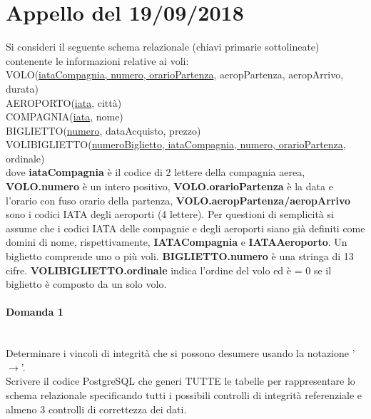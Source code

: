 \documentclass[a4paper, 10pt, titlepage]{article}
\begin{document}
\section{Appello del 19/09/2018}
Si consideri il seguente schema relazionale (chiavi primarie sottolineate) contenente le informazioni relative ai voli: \medskip \\
VOLO(\underline{iataCompagnia, numero, orarioPartenza}, aeropPartenza, aeropArrivo, durata)\\
AEROPORTO(\underline{iata}, città)\\
COMPAGNIA(\underline{iata}, nome)\\
BIGLIETTO(\underline{numero}, dataAcquisto, prezzo)\\
VOLIBIGLIETTO(\underline{numeroBiglietto, iataCompagnia, numero, orarioPartenza}, ordinale)\medskip \\
dove \textbf{iataCompagnia} è il codice di 2 lettere della compagnia aerea, \textbf{VOLO.numero} è un intero positivo, \textbf{VOLO.orarioPartenza} è la data e l'orario con fuso orario della partenza, \textbf{VOLO.aeropPartenza/aeropArrivo} sono i codici IATA degli aeroporti (4 lettere). Per questioni di semplicità si assume che i codici IATA delle compagnie e degli aeroporti siano già definiti come domini di nome, rispettivamente, \textbf{IATACompagnia} e \textbf{IATAAeroporto}. Un biglietto comprende uno o più voli. \textbf{BIGLIETTO.numero} è una stringa di 13 cifre. \textbf{VOLIBIGLIETTO.ordinale} indica l'ordine del volo ed è = 0 se il biglietto è composto da un solo volo.
\paragraph{Domanda 1}\dotfill 
\\Determinare i vincoli di integrità che si possono desumere usando la notazione '$\rightarrow$'.\\
Scrivere il codice PostgreSQL che generi TUTTE le tabelle per rappresentare lo schema relazionale specificando tutti i possibili controlli di integrità referenziale e almeno 3 controlli di correttezza dei dati.
\end{document}
